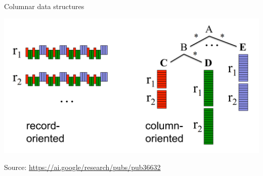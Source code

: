 \documentclass[aspectratio=169]{beamer}
\begin{document}
\begin{frame}{Columnar data structures}
\begin{center}
\includegraphics[width=0.95\linewidth]{google-dremel-fig1.png}
\end{center}

Source: \textcolor{blue}{\url{https://ai.google/research/pubs/pub36632}}
\end{frame}
\end{document}
